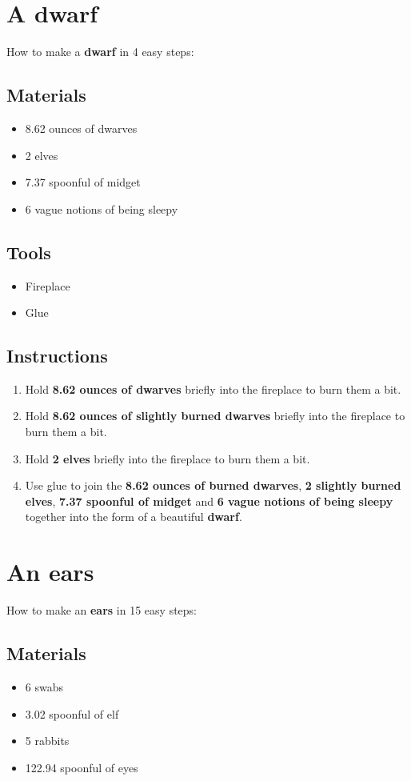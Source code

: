 \documentclass{article}
\begin{document}
\section{A dwarf}How to make a \textbf{dwarf} in 4 easy steps:

\subsection{Materials}\begin{itemize}
\item 
8.62 ounces of dwarves
\item 
2 elves
\item 
7.37 spoonful of midget
\item 
6 vague notions of being sleepy
\end{itemize}
\subsection{Tools}\begin{itemize}
\item 
Fireplace
\item 
Glue
\end{itemize}
\subsection{Instructions}\begin{enumerate}
\item 
Hold \textbf{8.62 ounces of dwarves} briefly into the fireplace to burn them a bit.
\item 
Hold \textbf{8.62 ounces of slightly burned dwarves} briefly into the fireplace to burn them a bit.
\item 
Hold \textbf{2 elves} briefly into the fireplace to burn them a bit.
\item 
Use glue to join the \textbf{8.62 ounces of burned dwarves}, \textbf{2 slightly burned elves}, \textbf{7.37 spoonful of midget} and \textbf{6 vague notions of being sleepy} together into the form of a beautiful \textbf{dwarf}.
\end{enumerate}
\newpage
\section{An ears}How to make an \textbf{ears} in 15 easy steps:

\subsection{Materials}\begin{itemize}
\item 
6 swabs
\item 
3.02 spoonful of elf
\item 
5 rabbits
\item 
122.94 spoonful of eyes
\end{itemize}
\end{document}
